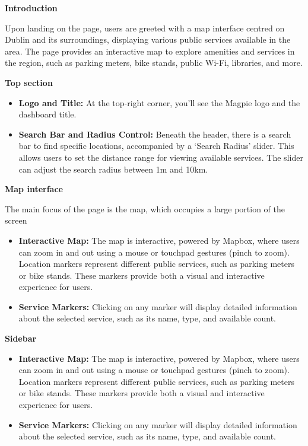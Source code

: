 \textbf{Introduction}

Upon landing on the page, users are greeted with a map interface centred on Dublin and its surroundings, displaying various public services available in the area. The page provides an interactive map to explore amenities and services in the region, such as parking meters, bike stands, public Wi{-}Fi, libraries, and more.

\textbf{Top section}

\begin{itemize}
    \item{} \textbf{Logo and Title:} At the top{-}right corner, you’ll see the Magpie logo and the dashboard title.
    \item{} \textbf{Search Bar and Radius Control:} Beneath the header, there is a search bar to find specific locations, accompanied by a `Search Radius' slider. This allows users to set the distance range for viewing available services. The slider can adjust the search radius between 1m and 10km.
\end{itemize}

\textbf{Map interface}

The main focus of the page is the map, which occupies a large portion of the screen

\begin{itemize}
    \item{} \textbf{Interactive Map:} The map is interactive, powered by Mapbox, where users can zoom in and out using a mouse or touchpad gestures (pinch to zoom). Location markers represent different public services, such as parking meters or bike stands. These markers provide both a visual and interactive experience for users.
    \item{} \textbf{Service Markers:} Clicking on any marker will display detailed information about the selected service, such as its name, type, and available count.
\end{itemize}

\textbf{Sidebar}

\begin{itemize}
    \item{} \textbf{Interactive Map:} The map is interactive, powered by Mapbox, where users can zoom in and out using a mouse or touchpad gestures (pinch to zoom). Location markers represent different public services, such as parking meters or bike stands. These markers provide both a visual and interactive experience for users.
    \item{} \textbf{Service Markers:} Clicking on any marker will display detailed information about the selected service, such as its name, type, and available count.
\end{itemize}

